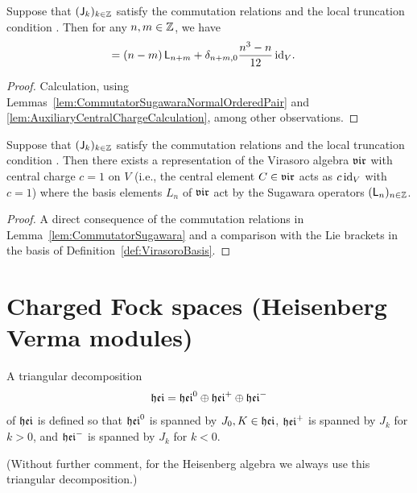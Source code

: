 \begin{lemma}
  \label{lem:CommutatorSugawara}
  \leanok
  Suppose that $(\mathsf{J}_{k})_{k \in \mathbb{Z}}$ satisfy the commutation relations
  \tagHeiComm{} and the local truncation condition
  \tagHeiTrunc{}. Then for any $n, m \in \mathbb{Z}$, we have
  \begin{align*}
    [\Loper_n, \Loper_m]
    = \; &
    (n-m) \, \Loper_{n+m} + \delta_{n+m,0} \frac{n^3 - n}{12} \, \id_V .
  \end{align*}
\end{lemma}
\begin{proof}
  \leanok
  Calculation, using Lemmas~\ref{lem:CommutatorSugawaraNormalOrderedPair}
  and \ref{lem:AuxiliaryCentralChargeCalculation}, among other observations.
\end{proof}

\begin{theorem}
  \label{thm:SugawaraRepresentation}
  \leanok
  Suppose that $(\mathsf{J}_{k})_{k \in \mathbb{Z}}$ satisfy the commutation relations
  \tagHeiComm{} and the local truncation condition
  \tagHeiTrunc{}. Then there exists a representation of the Virasoro algebra $\mathfrak{vir}$
  with central charge $c = 1$ on $V$ (i.e.,
  the central element $C \in \mathfrak{vir}$ acts as $c \, \mathrm{id}_V$ with $c = 1$)
  where the basis elements $L_n$ of $\mathfrak{vir}$ act by
  the Sugawara operators $(\mathsf{L}_n)_{n \in \mathbb{Z}}$.
\end{theorem}
\begin{proof}
  \leanok
  A direct consequence of the commutation relations in Lemma~\ref{lem:CommutatorSugawara}
  and a comparison with the Lie brackets in the basis of Definition~\ref{def:VirasoroBasis}.
\end{proof}


\section{Charged Fock spaces (Heisenberg Verma modules)}

\begin{definition}
  \label{def:HeisenbergTriangular}
  \leanok
  A triangular decomposition
  \begin{align*}
    \mathfrak{hei} = \mathfrak{hei}^0 \oplus \mathfrak{hei}^+ \oplus \mathfrak{hei}^-
  \end{align*}
  of $\mathfrak{hei}$ is defined so that $\mathfrak{hei}^0$ is spanned by $J_0, K \in \mathfrak{hei}$,
  $\mathfrak{hei}^+$ is spanned by $J_k$ for $k > 0$,
  and $\mathfrak{hei}^-$ is spanned by $J_k$ for $k < 0$.

  (Without further comment, for the Heisenberg algebra we always use this
  triangular decomposition.)
\end{definition}

